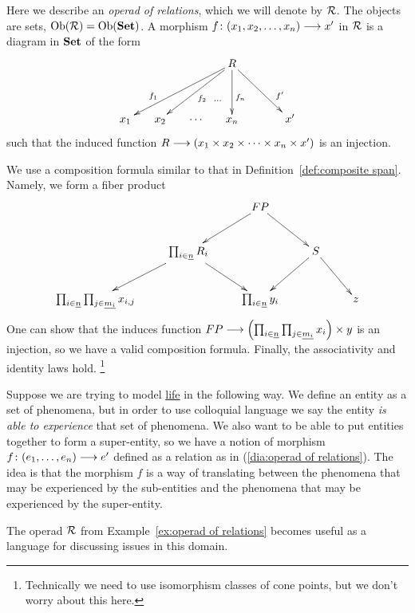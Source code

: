 \documentclass[CT4S-EN-RU]{subfiles}
\begin{document}
\begin{exampleENG}\label{ex:operad of relations}
Here we describe an {\em operad of relations}, which we will denote by $\mathcal{R}$. The objects are sets, $\textnormal{Ob}(\mathcal{R})=\textnormal{Ob}({\mathbf{Set}})$. A morphism $f\colon (x_1,x_2,\ldots,x_n)\longrightarrow x'$ in $\mathcal{R}$ is a diagram in ${\mathbf{Set}}$ of the form 
\begin{align}\label{dia:operad of relations}
\xymatrix@=15pt{&&&R\ar[llldd]_(.7){f_1}\ar[lldd]^{f_2}\ar@{}[ldd]^(.6)\cdots\ar[dd]^(.6){f_n}\ar[rrdd]^(.7){f'}\\\\x_1&x_2&\cdots&x_n&&x'}
\end{align} 
such that the induced function $R\longrightarrow(x_1\times x_2\times\cdots\times x_n\times x')$ is an injection.

We use a composition formula similar to that in Definition~\ref{def:composite span}. Namely, we form a fiber product
$$\xymatrix{&&FP\ar[rd]\ar[ld]\\&\prod_{i\in\ul{n}}R_i\ar[ld]\ar[rd]&&S\ar[ld]\ar[rd]\\\prod_{i\in\ul{n}}\prod_{j\in\ul{m_i}}x_{i,j}&&\prod_{i\in\ul{n}}y_i&&z}$$
One can show that the induces function $FP\longrightarrow\left(\prod_{i\in\underline{n}}\prod_{j\in\underline{m_i}}x_i\right)\times y$ is an injection, so we have a valid composition formula. Finally, the associativity and identity laws hold.
\footnote{Technically we need to use isomorphism classes of cone points, but we don't worry about this here.}
\end{exampleENG}

\begin{exampleRUS}\label{ex:operad of relations}
\end{exampleRUS}

\begin{applicationENG}\label{app:entity by experience}
Suppose we are trying to model \href{http://en.wikipedia.org/wiki/Life}{\text life} in the following way. We define an entity as a set of phenomena, but in order to use colloquial language we say the entity {\em is able to experience} that set of phenomena. We also want to be able to put entities together to form a super-entity, so we have a notion of morphism $f\colon(e_1,\ldots,e_n)\longrightarrow e'$ defined as a relation as in (\ref{dia:operad of relations}). The idea is that the morphism $f$ is a way of translating between the phenomena that may be experienced by the sub-entities and the phenomena that may be experienced by the super-entity. 

The operad $\mathcal{R}$ from Example~\ref{ex:operad of relations} becomes useful as a language for discussing issues in this domain.
\end{applicationENG}
\end{document}
